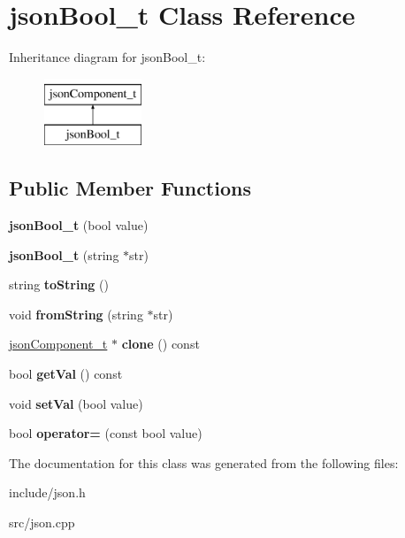 \hypertarget{classjsonBool__t}{\section{json\-Bool\-\_\-t \-Class \-Reference}
\label{classjsonBool__t}
}
\-Inheritance diagram for json\-Bool\-\_\-t\-:\begin{figure}[H]
\begin{center}
\leavevmode
\includegraphics[height=2.000000cm]{classjsonBool__t}
\end{center}
\end{figure}
\subsection*{\-Public \-Member \-Functions}
\begin{DoxyCompactItemize}
\item 
\hypertarget{classjsonBool__t_a1761613ee7c412a8fad54bb23ea35868}{{\bfseries json\-Bool\-\_\-t} (bool value)}\label{classjsonBool__t_a1761613ee7c412a8fad54bb23ea35868}

\item 
\hypertarget{classjsonBool__t_a0ad6c90fb13b46fe46a9aaf32ca233b1}{{\bfseries json\-Bool\-\_\-t} (string $\ast$str)}\label{classjsonBool__t_a0ad6c90fb13b46fe46a9aaf32ca233b1}

\item 
\hypertarget{classjsonBool__t_a94f8ebdbdb9cc4f8f181ca2729ecee2b}{string {\bfseries to\-String} ()}\label{classjsonBool__t_a94f8ebdbdb9cc4f8f181ca2729ecee2b}

\item 
\hypertarget{classjsonBool__t_a89fbeeeb57da84a5f6424ae837f45757}{void {\bfseries from\-String} (string $\ast$str)}\label{classjsonBool__t_a89fbeeeb57da84a5f6424ae837f45757}

\item 
\hypertarget{classjsonBool__t_a2224d6061f5d9a51531aa3ac5ea6199c}{\hyperlink{classjsonComponent__t}{json\-Component\-\_\-t} $\ast$ {\bfseries clone} () const }\label{classjsonBool__t_a2224d6061f5d9a51531aa3ac5ea6199c}

\item 
\hypertarget{classjsonBool__t_a7d9f92d25d657845f1b79d4de8049c16}{bool {\bfseries get\-Val} () const }\label{classjsonBool__t_a7d9f92d25d657845f1b79d4de8049c16}

\item 
\hypertarget{classjsonBool__t_a2309da34b7c0e0c99dd9962484c214c5}{void {\bfseries set\-Val} (bool value)}\label{classjsonBool__t_a2309da34b7c0e0c99dd9962484c214c5}

\item 
\hypertarget{classjsonBool__t_a402b6d3f359eb20695bf17b336bdd39e}{bool {\bfseries operator=} (const bool value)}\label{classjsonBool__t_a402b6d3f359eb20695bf17b336bdd39e}

\end{DoxyCompactItemize}


\-The documentation for this class was generated from the following files\-:\begin{DoxyCompactItemize}
\item 
include/json.\-h\item 
src/json.\-cpp\end{DoxyCompactItemize}

